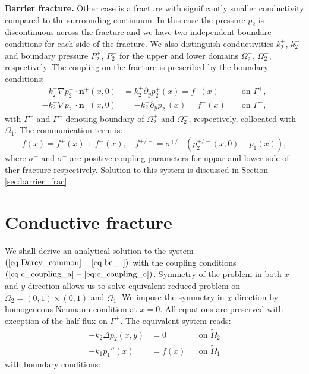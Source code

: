 \documentclass[a4paper,10pt]{article}
\def\Laplace{\Delta}
\def\prtl{\partial} %
\def\grad{\nabla}
\def\vc#1{\mathbf{\boldsymbol{#1}}}     %
\begin{document}
{\bf Barrier fracture.} Other case is a fracture with significantly smaller conductivity compared to the surrounding continuum. In this case
the pressure $p_2$ is discontinuous across the fracture and we have two independent boundare conditions for each side of the fracture. We also 
distinguish conductivities $k_2^+$, $k_2^-$ and boundary pressure $P_2^+$, $P_2^-$ for the upper and lower domains $\Omega_2^+$, $\Omega_2^-$, 
respectively. The coupling on the fracture is prescribed by the boundary conditions:
\begin{align}
  \label{eq:bc_barrier_p}  
  - k_2^+ \grad p_2^+\cdot \vc n^+(x,0) &= k_2^+ \prtl_y p_2^+(x) = f^+(x) 
                    &&\text{ on }\Gamma^{+},\\
  \label{eq:bc_barrier_m}
  - k_2^- \grad p_2^-\cdot \vc n^-(x,0) &= -k_2^- \prtl_y p_2^-(x) = f^-(x) 
                    &&\text{ on }\Gamma^{-},
\end{align}
with $\Gamma^{+}$ and $\Gamma^{-}$ denoting boundary of $\Omega_2^+$ and $\Omega_2^-$, respectively, collocated with $\Omega_1$.
The communication term is:
\begin{equation}
  \label{eq:coupling_barrier}
  f(x) = f^+(x) + f^-(x),\quad f^{+/-} = \sigma^{+/-} (p^{+/-}_2(x,0) - p_1(x)),
\end{equation}
where $\sigma^+$ and $\sigma^-$ are positive coupling parameters for uppar and lower side of ther fracture respectively. 
Solution to this system is discussed in Section \ref{sec:barrier_frac}. 

\section{Conductive fracture }
\label{sec:continuous_frac}
We shall derive an analytical solution to the system $(\ref{eq:Darcy_common} - \ref{eq:bc_1})$ with the coupling conditions 
$(\ref{eq:c_coupling_a} - \ref{eq:c_coupling_c})$. Symmetry of the problem in 
both $x$ and $y$ direction allows us to solve equivalent reduced problem on $\widetilde\Omega_2=(0,1)\times(0,1)$ and  
$\widetilde\Omega_1$. We impose the symmetry in $x$ direction by homogeneous Neumann condition at $x=0$. 
All equations are preserved with exception of the half flux on $\Gamma^+$. The equivalent system  reads:
\begin{align}
    \label{eq:cc_darcy_2d}
    -k_2 \Laplace p_2(x,y) &= 0         &&\text{on }\widetilde\Omega_2 \\
    \label{eq:cc_darcy_1d}
    -k_1 p_1''(x) &= f(x)               &&\text{on }\widetilde\Omega_1
\end{align}
with boundary conditions:    
\end{document}
